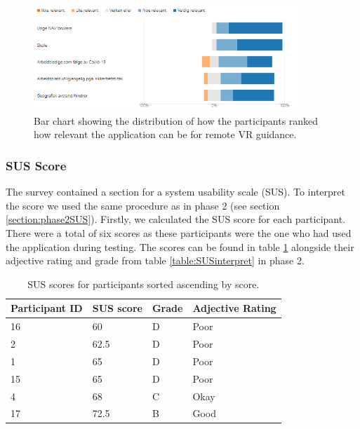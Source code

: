 \begin{figure}[H]
  \centering
   \captionsetup{width=.8\linewidth}
    \includegraphics[width=0.9\textwidth]{fig/phase_3/survey/RemoteUseCases.PNG}
 \caption{Bar chart showing the distribution of how the participants ranked how relevant the application can be for remote VR guidance.}
\label{fig:phase3_RemoteUsecases}
\end{figure}


\subsubsection{SUS Score}
The survey contained a section for a system usability scale (SUS). To interpret the score we used the same procedure as in phase 2 (see section \ref{section:phase2SUS}). Firstly, we calculated the SUS score for each participant. There were a total of six scores as these participants were the one who had used the application during testing. The scores can be found in table \ref{table:phase3SUSscores} alongside their adjective rating and grade from table \ref{table:SUSinterpret} in phase 2.


\begin{table}[H]
\centering
\begin{tabular}{l|l|l|l}
{\textbf{Participant ID}} & { \textbf{SUS score}} & { \textbf{Grade}} & { \textbf{Adjective Rating}}\\ \hline
16   & 60   &  D & Poor                                   \\ 
2   & 62.5 &  D & Poor                                    \\ 
1   & 65 &  D & Poor                                   \\ 
15   & 65 &  D & Poor                                     \\ 
4   & 68 &  C & Okay                                    \\ 
17   & 72.5 &  B & Good                                     \\ 
\end{tabular}
\caption{SUS scores for participants sorted ascending by score.}
\label{table:phase3SUSscores}
\end{table}


